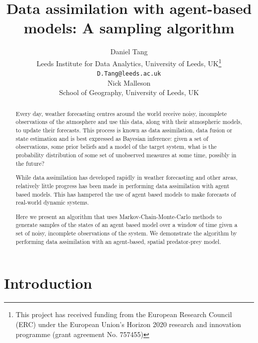 \documentclass{article}
\title{Data assimilation with agent-based models: A sampling algorithm}
\author{
  Daniel Tang\\
    Leeds Institute for Data Analytics, University of Leeds, UK\thanks{This project has received funding from the European Research Council (ERC) under the European Union’s Horizon 2020 research and innovation programme (grant agreement No. 757455)}\\
  \texttt{D.Tang@leeds.ac.uk}\\
  \AND
  Nick Malleson\\
  School of Geography, University of Leeds, UK\\  
}
\begin{document}
\maketitle

\begin{abstract}
Every day, weather forecasting centres around the world receive noisy, incomplete observations of the atmosphere and use this data, along with their atmospheric models, to update their forecasts. This process is known as data assimilation, data fusion or state estimation and is best expressed as Bayesian inference: given a set of observations, some prior beliefs and a model of the target system, what is the probability distribution of some set of unobserved measures at some time, possibly in the future?

While data assimilation has developed rapidly in weather forecasting and other areas, relatively little progress has been made in performing data assimilation with agent based models. This has hampered the use of agent based models to make forecasts of real-world dynamic systems.

Here we present an algorithm that uses Markov-Chain-Monte-Carlo methods to generate samples of the states of an agent based model over a window of time given a set of noisy, incomplete observations of the system. We demonstrate the algorithm by performing data assimilation with an agent-based, spatial predator-prey model.
\end{abstract}


\section{Introduction}
\end{document}
